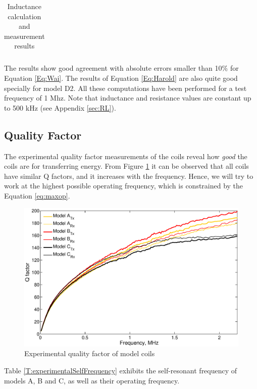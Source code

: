 \begin{table}[ht]
\begin{center}
\begin{tabular}{c|c|c|c|c|r}
\end{tabular}
\caption{Inductance calculation and measurement results}
\end{center}
\end{table}

The results show good agreement with absolute errors smaller than 10$\%$ for Equation \ref{Eq:Wai}. The results of Equation \ref{Eq:Harold} are also quite good specially for model D2. All these computations have been performed for a test frequency of 1 Mhz. Note that inductance and resistance values are constant up to 500 kHz (see Appendix \ref{sec:RL}).


	\subsection{Quality Factor}
The experimental quality factor measurements of the coils reveal how \textit{good} the coils are for transferring energy. From Figure \ref{F:experimentalQualityFactor} it can be observed that all coils have similar Q factors, and it increases with the frequency. Hence, we will try to work at the highest possible operating frequency, which is constrained by the Equation \ref{eq:maxop}.

\begin{figure}[htb]
\begin{center}
\includegraphics[width=1\textwidth]{./images/qualityFactor}
\caption{Experimental quality factor of model coils}
\label{F:experimentalQualityFactor}
\end{center}
\end{figure}

Table \ref{T:experimentalSelfFrequency} exhibits the self-resonant frequency of models A, B and C, as well as their operating frequency.

